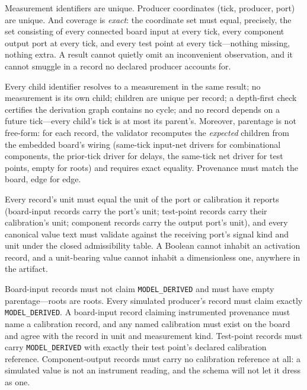 \begin{invariant}\label{ch08:inv:coverage}
Measurement identifiers are unique. Producer coordinates (tick, producer, port) are unique. And coverage is \emph{exact}: the coordinate set must equal, precisely, the set consisting of every connected board input at every tick, every component output port at every tick, and every test point at every tick---nothing missing, nothing extra. A result cannot quietly omit an inconvenient observation, and it cannot smuggle in a record no declared producer accounts for.
\end{invariant}

\begin{invariant}\label{ch08:inv:acyclic}
Every child identifier resolves to a measurement in the same result; no measurement is its own child; children are unique per record; a depth-first check certifies the derivation graph contains no cycle; and no record depends on a future tick---every child's tick is at most its parent's. Moreover, parentage is not free-form: for each record, the validator recomputes the \emph{expected} children from the embedded board's wiring (same-tick input-net drivers for combinational components, the prior-tick driver for delays, the same-tick net driver for test points, empty for roots) and requires exact equality. Provenance must match the board, edge for edge.
\end{invariant}

\begin{invariant}\label{ch08:inv:units}
Every record's unit must equal the unit of the port or calibration it reports (board-input records carry the port's unit; test-point records carry their calibration's unit; component records carry the output port's unit), and every canonical value text must validate against the receiving port's signal kind and unit under the closed admissibility table. A Boolean cannot inhabit an activation record, and a unit-bearing value cannot inhabit a dimensionless one, anywhere in the artifact.
\end{invariant}

\begin{invariant}\label{ch08:inv:kinds}
Board-input records must not claim \texttt{MODEL\_DERIVED} and must have empty parentage---roots are roots. Every simulated producer's record must claim exactly \texttt{MODEL\_DERIVED}. A board-input record claiming instrumented provenance must name a calibration record, and any named calibration must exist on the board and agree with the record in unit and measurement kind. Test-point records must carry \texttt{MODEL\_DERIVED} with exactly their test point's declared calibration reference. Component-output records must carry no calibration reference at all: a simulated value is not an instrument reading, and the schema will not let it dress as one.
\end{invariant}

